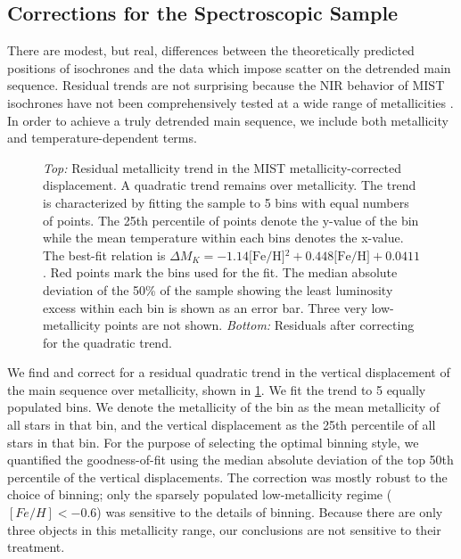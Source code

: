 \documentclass[manuscript]{aastex6}
\newcommand{\MK}{\ensuremath{M_K}}
\newcommand{\feh}{\textrm{[Fe/H]}}
\begin{document}
\subsection{Corrections for the Spectroscopic Sample}
\label{sec:speccor}

There are modest, but real, differences between the theoretically predicted
positions of isochrones and the data which impose scatter on the detrended main 
sequence. Residual trends are not surprising because the NIR behavior of MIST 
isochrones have not been comprehensively tested at a wide range of metallicities 
\citep{Choi16}.  In order to achieve a truly detrended main sequence, we include 
both metallicity and temperature-dependent terms.

\begin{figure}[htb]
    \centering
    \caption{\emph{Top:} Residual metallicity trend in the MIST 
        metallicity-corrected displacement. A quadratic trend remains over 
        metallicity. The trend is characterized by fitting the sample to 
        5 bins with equal numbers of points.  The 25th percentile of points 
        denote the y-value of the bin while the mean temperature within each
        bins denotes the x-value. The best-fit relation is \(\Delta
            \MK{} = -1.14\feh{}^2 + 0.448 \feh{} + 0.0411\). Red points mark 
            the bins used for the fit.  The median absolute deviation of the 
            50\% of the sample showing the
        least luminosity excess within each bin is shown as an error bar. Three 
        very low-metallicity points are not shown.  \emph{Bottom:} Residuals 
        after correcting for the quadratic trend.}\label{fig:met_trend}
\end{figure}

We find and correct for a residual quadratic trend in the vertical 
displacement of the main sequence over metallicity, shown in 
\cref{fig:met_trend}.  We fit the trend to 5 equally populated bins. We denote 
the metallicity of the bin as the mean metallicity of all stars in that bin, 
and the vertical displacement as the 25th percentile of all stars in that bin. 
For the purpose of selecting the optimal binning style, we quantified the 
goodness-of-fit using the median absolute deviation of the top 50th percentile 
of the vertical displacements. The correction was mostly robust to the choice 
of binning; only the sparsely populated low-metallicity regime 
(\([Fe/H] < -0.6\)) was sensitive to the details of binning. Because there are 
only three objects in this metallicity range, our conclusions are not 
sensitive to their treatment.
\end{document}
